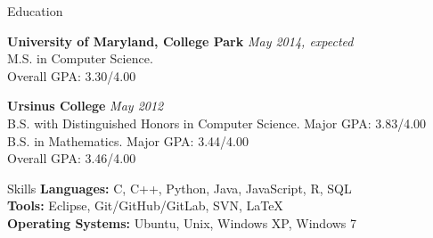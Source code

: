 \documentclass{resume} %
\begin{document}

\begin{rSection}{Education}

{\bf University of Maryland, College Park} \hfill {\em May 2014, expected} \\ 
M.S. in Computer Science.\\
Overall GPA: 3.30/4.00

{\bf Ursinus College} \hfill {\em May 2012} \\ 
B.S. with Distinguished Honors in Computer Science. Major GPA: 3.83/4.00\\
B.S. in Mathematics. Major GPA: 3.44/4.00\\
Overall GPA: 3.46/4.00
\end{rSection}

\begin{rSection}{Skills}
\textbf{Languages:} C, C++, Python, Java, JavaScript, R, SQL\\
\textbf{Tools:} Eclipse, Git/GitHub/GitLab, SVN, LaTeX\\
\textbf{Operating Systems:} Ubuntu, Unix, Windows XP, Windows 7
\end{rSection}
\end{document}
